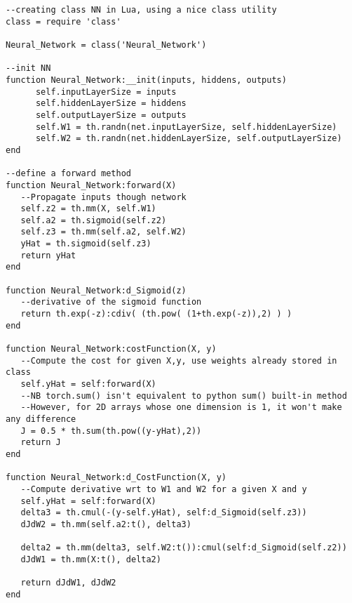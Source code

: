 \begin{lstlisting}[language={[5.2]Lua}]
--creating class NN in Lua, using a nice class utility
class = require 'class'

Neural_Network = class('Neural_Network')

--init NN
function Neural_Network:__init(inputs, hiddens, outputs)
      self.inputLayerSize = inputs
      self.hiddenLayerSize = hiddens
      self.outputLayerSize = outputs
      self.W1 = th.randn(net.inputLayerSize, self.hiddenLayerSize)
      self.W2 = th.randn(net.hiddenLayerSize, self.outputLayerSize)
end

--define a forward method
function Neural_Network:forward(X)
   --Propagate inputs though network
   self.z2 = th.mm(X, self.W1)
   self.a2 = th.sigmoid(self.z2)
   self.z3 = th.mm(self.a2, self.W2)
   yHat = th.sigmoid(self.z3)
   return yHat
end

function Neural_Network:d_Sigmoid(z)
   --derivative of the sigmoid function
   return th.exp(-z):cdiv( (th.pow( (1+th.exp(-z)),2) ) )
end

function Neural_Network:costFunction(X, y)
   --Compute the cost for given X,y, use weights already stored in class
   self.yHat = self:forward(X)
   --NB torch.sum() isn't equivalent to python sum() built-in method
   --However, for 2D arrays whose one dimension is 1, it won't make any difference
   J = 0.5 * th.sum(th.pow((y-yHat),2))
   return J
end

function Neural_Network:d_CostFunction(X, y)
   --Compute derivative wrt to W1 and W2 for a given X and y
   self.yHat = self:forward(X)
   delta3 = th.cmul(-(y-self.yHat), self:d_Sigmoid(self.z3))
   dJdW2 = th.mm(self.a2:t(), delta3)

   delta2 = th.mm(delta3, self.W2:t()):cmul(self:d_Sigmoid(self.z2))
   dJdW1 = th.mm(X:t(), delta2)

   return dJdW1, dJdW2
end

\end{lstlisting}

